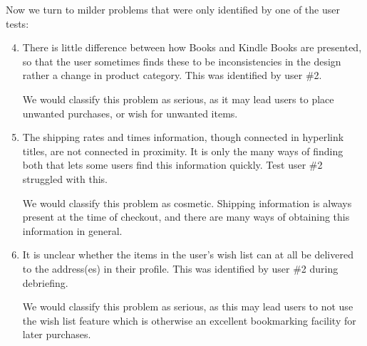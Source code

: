 Now we turn to milder problems that were only identified by one of the user
tests:

\begin{enumerate}

\setcounter{enumi}{3}

\item There is little difference between how Books and Kindle Books are
presented, so that the user sometimes finds these to be inconsistencies in the
design rather a change in product category. This was identified by user \#2.

We would classify this problem as serious, as it may lead users to place
unwanted purchases, or wish for unwanted items.

\item The shipping rates and times information, though connected in hyperlink
titles, are not connected in proximity. It is only the many ways of finding
both that lets some users find this information quickly. Test user \#2
struggled with this.

We would classify this problem as cosmetic. Shipping information is always
present at the time of checkout, and there are many ways of obtaining this
information in general.

\item It is unclear whether the items in the user's wish list can at all be
delivered to the address(es) in their profile. This was identified by user \#2
during debriefing.

We would classify this problem as serious, as this may lead users to not use
the wish list feature which is otherwise an excellent bookmarking facility for
later purchases.

\end{enumerate}
